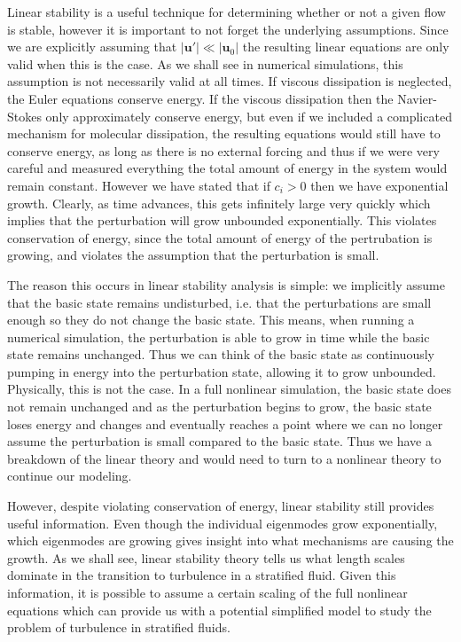 Linear stability is a useful technique for determining whether or not a given flow is stable, however it is important to not forget the underlying assumptions. Since we are explicitly assuming that $|\bm{u}'|\ll |\bm{u}_{0}|$ the resulting linear equations are only valid when this is the case. As we shall see in numerical simulations, this assumption is not necessarily valid at all times. If viscous dissipation is neglected, the Euler equations conserve energy. If the viscous dissipation then the Navier-Stokes only approximately conserve energy, but even if we included a complicated mechanism for molecular dissipation, the resulting equations would still have to conserve energy, as long as there is no external forcing and thus if we were very careful and measured everything the total amount of energy in the system would remain constant. However we have stated that if $c_{i}>0$ then we have exponential growth. Clearly, as time advances, this gets infinitely large very quickly which implies that the perturbation will grow unbounded exponentially. This violates conservation of energy, since the total amount of energy of the pertrubation is growing, and violates the assumption that the perturbation is small.  

The reason this occurs in linear stability analysis is simple: we implicitly assume that the basic state remains undisturbed, i.e. that the perturbations are small enough so they do not change the basic state. This means, when running a numerical simulation, the perturbation is able to grow in time while the basic state remains unchanged. Thus we can think of the basic state as continuously pumping in energy into the perturbation state, allowing it to grow unbounded. Physically, this is not the case. In a full nonlinear simulation, the basic state does not remain unchanged and as the perturbation begins to grow, the basic state loses energy and changes and eventually reaches a point where we can no longer assume the perturbation is small compared to the basic state. Thus we have a breakdown of the linear theory and would need to turn to a nonlinear theory to continue our modeling. 

However, despite violating conservation of energy, linear stability still provides useful information. Even though the individual eigenmodes grow exponentially, which eigenmodes are growing gives insight into what mechanisms are causing the growth. As we shall see, linear stability theory tells us what length scales dominate in the transition to turbulence in a stratified fluid. Given this information, it is possible to assume a certain scaling of the full nonlinear equations which can provide us with a potential simplified model to study the problem of turbulence in stratified fluids. 

